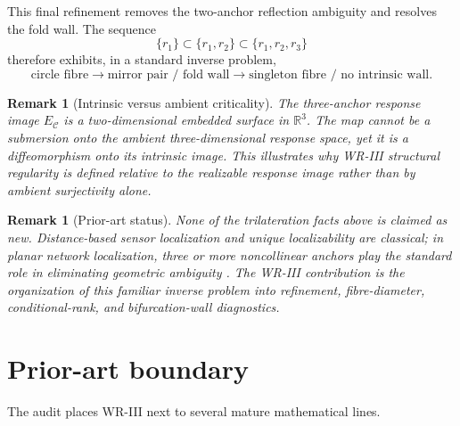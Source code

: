 \documentclass[11pt]{article}
\newtheorem{remark}[definition]{Remark}
\begin{document}
This final refinement removes the two-anchor reflection ambiguity and resolves
the fold wall. The sequence
\[
\{r_1\}
\subset
\{r_1,r_2\}
\subset
\{r_1,r_2,r_3\}
\]
therefore exhibits, in a standard inverse problem,
\[
\text{circle fibre}
\longrightarrow
\text{mirror pair / fold wall}
\longrightarrow
\text{singleton fibre / no intrinsic wall}.
\]

\begin{remark}[Intrinsic versus ambient criticality]
The three-anchor response image \(E_{\mathcal C}\) is a two-dimensional
embedded surface in \(\mathbb R^3\). The map cannot be a submersion onto the
ambient three-dimensional response space, yet it is a diffeomorphism onto its
intrinsic image. This illustrates why WR-III structural regularity is defined
relative to the realizable response image rather than by ambient surjectivity
alone.
\end{remark}

\begin{remark}[Prior-art status]
None of the trilateration facts above is claimed as new. Distance-based sensor
localization and unique localizability are classical; in planar network
localization, three or more noncollinear anchors play the standard role in
eliminating geometric ambiguity \cite{AspnesEtAl2006,AndersonEtAl2010}.
The WR-III contribution is the organization of this familiar inverse problem
into refinement, fibre-diameter, conditional-rank, and bifurcation-wall
diagnostics.
\end{remark}


\section{Prior-art boundary}

The audit places WR-III next to several mature mathematical lines.
\end{document}
